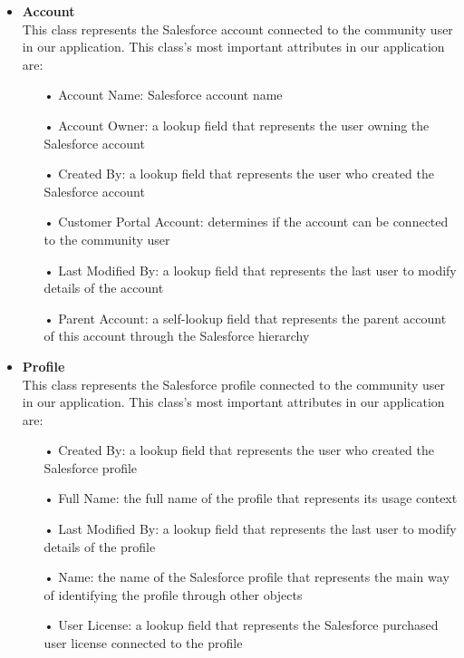 \begin{itemize}
\begin{itemize}
\end{itemize}
\item \textbf{Account}\\
This class represents the Salesforce account connected to the community user in our application. This class's most important attributes in our application are:
\begin{itemize}
\item[•] Account Name: Salesforce account name
\item[•] Account Owner: a lookup field that represents the user owning the Salesforce account 
\item[•] Created By: a lookup field that represents the user who created the Salesforce account 
\item[•] Customer Portal Account: determines if the account can be connected to the community user
\item[•] Last Modified By: a lookup field that represents the last user to modify details of the account
\item[•] Parent Account: a self-lookup field that represents the parent account of this account through the Salesforce hierarchy
\end{itemize}
\item \textbf{Profile}\\
This class represents the Salesforce profile connected to the community user in our application. This class's most important attributes in our application are:
\begin{itemize}
\item[•] Created By: a lookup field that represents the user who created the Salesforce profile 
\item[•] Full Name: the full name of the profile that represents its usage context 
\item[•] Last Modified By: a lookup field that represents the last user to modify details of the profile
\item[•] Name: the name of the Salesforce profile that represents the main way of identifying the profile through other objects
\item[•] User License: a lookup field that represents the Salesforce purchased user license connected to the profile 


\end{itemize}
\end{itemize}
